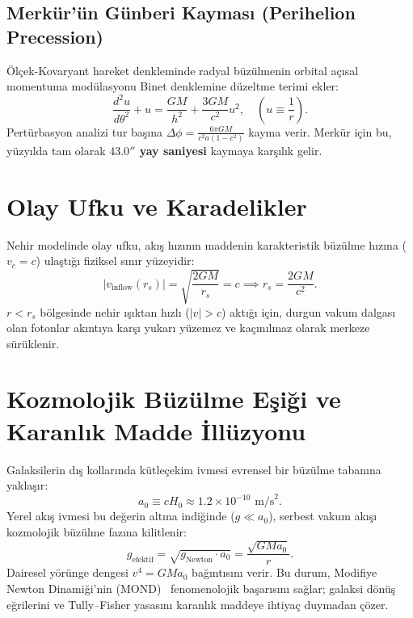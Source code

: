 \documentclass[11pt,a4paper]{article}
\begin{document}
\subsection{Merkür'ün Günberi Kayması (Perihelion Precession)}
Ölçek-Kovaryant hareket denkleminde radyal büzülmenin orbital açısal momentuma modülasyonu Binet denklemine düzeltme terimi ekler:
\begin{equation}
    \frac{d^2 u}{d\theta^2} + u = \frac{GM}{h^2} + \frac{3GM}{c^2} u^2, \quad \left(u \equiv \frac{1}{r}\right).
    \label{eq:binet}
\end{equation}
Pertürbasyon analizi tur başına $\Delta \phi = \frac{6\pi GM}{c^2 a (1-e^2)}$ kayma verir. Merkür için bu, yüzyılda tam olarak \textbf{$43.0''$ yay saniyesi} kaymaya karşılık gelir.

\section{Olay Ufku ve Karadelikler}
\label{sec:karadelikler}

Nehir modelinde olay ufku, akış hızının maddenin karakteristik büzülme hızına ($v_c = c$) ulaştığı fiziksel sınır yüzeyidir:
\begin{equation}
    |v_{\mathrm{inflow}}(r_s)| = \sqrt{\frac{2GM}{r_s}} = c \implies r_s = \frac{2GM}{c^2}.
    \label{eq:ufuk_yaricap}
\end{equation}
$r < r_s$ bölgesinde nehir ışıktan hızlı ($|v| > c$) aktığı için, durgun vakum dalgası olan fotonlar akıntıya karşı yukarı yüzemez ve kaçınılmaz olarak merkeze sürüklenir.

\section{Kozmolojik Büzülme Eşiği ve Karanlık Madde İllüzyonu}
\label{sec:karanlik_madde}

Galaksilerin dış kollarında kütleçekim ivmesi evrensel bir büzülme tabanına yaklaşır:
\begin{equation}
    a_0 \equiv c H_0 \approx 1.2 \times 10^{-10}\text{ m/s}^2.
    \label{eq:a0_esik}
\end{equation}
Yerel akış ivmesi bu değerin altına indiğinde ($g \ll a_0$), serbest vakum akışı kozmolojik büzülme fazına kilitlenir:
\begin{equation}
    g_{\mathrm{efektif}} = \sqrt{g_{\mathrm{Newton}} \cdot a_0} = \frac{\sqrt{GM a_0}}{r}.
    \label{eq:mond_limit}
\end{equation}
Dairesel yörünge dengesi $v^4 = G M a_0$ bağıntısını verir. Bu durum, Modifiye Newton Dinamiği'nin (MOND)~\cite{milgrom1983} fenomenolojik başarısını sağlar; galaksi dönüş eğrilerini ve Tully--Fisher yasasını karanlık maddeye ihtiyaç duymadan çözer.
\end{document}
